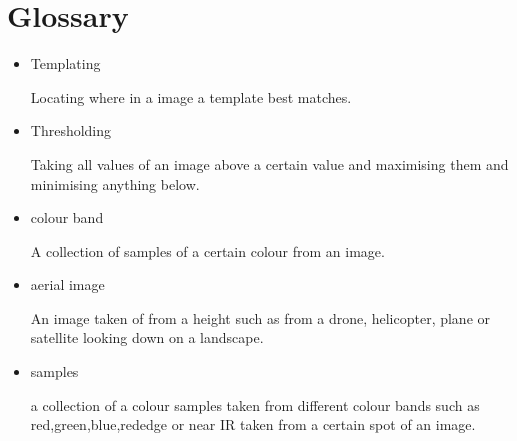 \thispagestyle{empty}


\section*{\centering Glossary}

\begin{itemize}
    \item Templating
    
    Locating where in a image a template best matches.
    
    \item Thresholding
    
    Taking all values of an image above a certain value and maximising them and minimising anything below.
    
    \item colour band
    
    A collection of samples of a certain colour from an image.
    
    \item aerial image
    
    An image taken of from a height such as from a drone, helicopter, plane or satellite looking down on a landscape.
    
    \item samples
    
    a collection of a colour samples taken from different colour bands such as red,green,blue,rededge or near IR taken from a certain spot of an image. 
    
    
    
\end{itemize}

